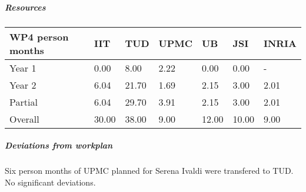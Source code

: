 
\subparagraph{Resources}

\begin{center}
\begin{tabular}{|C{1.5cm}|C{1.5cm}|C{1.5cm}|C{2cm}|C{2cm}|C{2cm}|C{2cm}|}
\hline
\footnotesize \textbf{WP4 person months}& \footnotesize \textbf{IIT}&\footnotesize \textbf{TUD}&\footnotesize \textbf{UPMC}& \footnotesize \textbf{UB} &\footnotesize \textbf{JSI} &\footnotesize \textbf{INRIA}\\ \hline
\footnotesize Year 1 &  0.00 & 8.00 & 2.22 & 0.00 & 0.00 & -     \\  \hline
\footnotesize Year 2 &  6.04 & 21.70 & 1.69 & 2.15 & 3.00 & 2.01     \\  \hline
\footnotesize Partial &  6.04 & 29.70 & 3.91 & 2.15 & 3.00 & 2.01 \\ \hline \hline
\footnotesize Overall &  30.00 & 38.00 & 9.00 & 12.00 & 10.00 & 9.00 \\ \hline
\end{tabular}
\end{center}

\subparagraph{Deviations from workplan} 
Six person months of UPMC planned for Serena Ivaldi were transfered to TUD. No significant deviations. 
